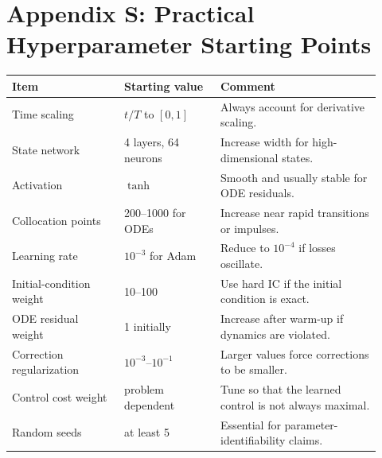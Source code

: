 \documentclass[11pt,a4paper]{article}
\begin{document}
\section{Appendix S: Practical Hyperparameter Starting Points}
\begin{longtable}{p{0.28\linewidth}p{0.24\linewidth}p{0.40\linewidth}}
\toprule
Item & Starting value & Comment \\
\midrule
Time scaling & $t/T$ to $[0,1]$ & Always account for derivative scaling. \\
State network & 4 layers, 64 neurons & Increase width for high-dimensional states. \\
Activation & $\tanh$ & Smooth and usually stable for ODE residuals. \\
Collocation points & 200--1000 for ODEs & Increase near rapid transitions or impulses. \\
Learning rate & $10^{-3}$ for Adam & Reduce to $10^{-4}$ if losses oscillate. \\
Initial-condition weight & 10--100 & Use hard IC if the initial condition is exact. \\
ODE residual weight & 1 initially & Increase after warm-up if dynamics are violated. \\
Correction regularization & $10^{-3}$--$10^{-1}$ & Larger values force corrections to be smaller. \\
Control cost weight & problem dependent & Tune so that the learned control is not always maximal. \\
Random seeds & at least 5 & Essential for parameter-identifiability claims. \\
\bottomrule
\end{longtable}
\end{document}
